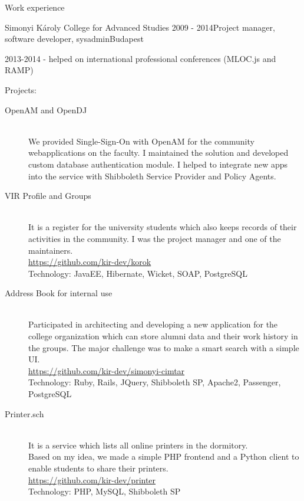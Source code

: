 \documentclass{resume} %
\begin{document}
\begin{rSection}{Work experience}

\begin{rSubsection}{Simonyi Károly College for Advanced Studies}
{2009 - 2014}{Project manager, software developer, sysadmin}{Budapest}
\item 2013-2014 - helped on international professional conferences (MLOC.js and RAMP)
\item Projects:
	\begin{description}
		\item[OpenAM and OpenDJ] \hfill \\
		We provided Single-Sign-On with OpenAM for the community webapplications on the faculty.
		I maintained the solution and developed custom database authentication module.
		I helped to integrate	new apps into the service with Shibboleth Service Provider
		and Policy Agents.
		\item[VIR Profile and Groups] \hfill \\
		It is a register for the university students which also keeps records of
		their activities in the community. I was the project manager and one of the
		maintainers. \\
		\url{https://github.com/kir-dev/korok} \\
		Technology: JavaEE, Hibernate, Wicket, SOAP, PostgreSQL
		\item[Address Book for internal use] \hfill \\
	  Participated in architecting and developing a new application for the college
	  organization which can store alumni data and their work history in the groups.
	  The major challenge was to make a smart search with a simple UI. \\
	  \url{https://github.com/kir-dev/simonyi-cimtar} \\
		Technology: Ruby, Rails, JQuery, Shibboleth SP, Apache2, Passenger, PostgreSQL
		\item[Printer.sch] \hfill \\
		It is a service which lists all online printers in the dormitory. \\
		Based on my idea, we made a simple PHP frontend and a Python client to enable students
		to share their printers. \\
		\url{https://github.com/kir-dev/printer} \\
		Technology: PHP, MySQL, Shibboleth SP
	\end{description}
\end{rSubsection}


\end{rSection}
\end{document}
